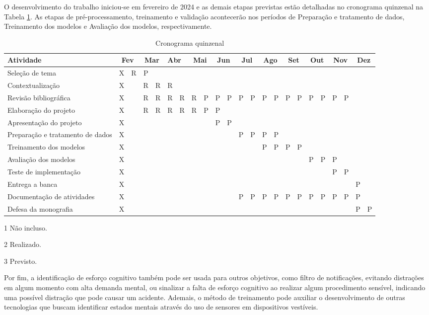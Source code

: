 O desenvolvimento do trabalho iniciou-se em fevereiro de 2024 e as demais etapas previstas estão detalhadas no cronograma quinzenal na Tabela \ref{ref:cronograma}. As etapas de pré-processamento, treinamento e validação acontecerão nos períodos de Preparação e tratamento de dados, Treinamento dos modelos e Avaliação dos modelos, respectivamente.  
\begin{table}
\centering
\tiny
\begin{threeparttable}
\caption{Cronograma quinzenal}
\label{ref:cronograma} 
\setlength\tabcolsep{5pt}
\begin{tabular}{ |l|c|c|c|c|c|c|c|c|c|c|c|c|c|c|c|c|c|c|c|c|c|c| } 
\hline
Atividade & \multicolumn{2}{|c|}{Fev} & \multicolumn{2}{|c|}{Mar} & \multicolumn{2}{|l|}{Abr} & \multicolumn{2}{|c|}{Mai} & \multicolumn{2}{|c|}{Jun} & \multicolumn{2}{|c|}{Jul} & \multicolumn{2}{|c|}{Ago} & \multicolumn{2}{|c|}{Set} & \multicolumn{2}{|c|}{Out} & \multicolumn{2}{|c|}{Nov} & \multicolumn{2}{|c|}{Dez} \\
\hline
Seleção de tema &X\tnote{1}&R\tnote{2}&P\tnote{3}&&&&&&&&&&&&&&&&&&& \\
\hline
Contextualização &X&&R&R&R&&&&&&&&&&&&&&&&&\\
\hline
Revisão bibliográfica &X&&R&R&R&R&R&P&P&P&P&P&P&P&P&P&P&P&P&P&&\\
\hline
Elaboração do projeto &X&&R&R&R&R&R&P&P&&&&&&&&&&&&&\\
\hline
Apresentação do projeto &X&&&&&&&&P&P&&&&&&&&&&&&\\
\hline
Preparação e tratamento de dados &X&&&&&&&&&&P&P&P&P&&&&&&&&\\
\hline
Treinamento dos modelos &X&&&&&&&&&&&&P&P&P&P&&&&&&\\
\hline
Avaliação dos modelos &X&&&&&&&&&&&&&&&&P&P&P&&&\\
\hline
Teste de implementação &X&&&&&&&&&&&&&&&&&&P&P&&\\
\hline
Entrega a banca &X&&&&&&&&&&&&&&&&&&&&P&\\
\hline
Documentação de atividades &X&&&&&&&&&&P&P&P&P&P&P&P&P&P&P&P&\\
\hline
Defesa da monografia &X&&&&&&&&&&&&&&&&&&&&P&P\\
\hline
\end{tabular}
\begin{tablenotes}
\item[1] Não incluso.
\item[2] Realizado.
\item[3] Previsto.
\end{tablenotes}
\end{threeparttable}
\sourcemedaddy
\end{table}

Por fim, a identificação de esforço cognitivo também pode ser usada para outros objetivos, como filtro de notificações, evitando distrações em algum momento com alta demanda mental, ou sinalizar a falta de esforço cognitivo ao realizar algum procedimento sensível, indicando uma possível distração que pode causar um acidente. Ademais, o método de treinamento pode auxiliar o desenvolvimento de outras tecnologias que buscam identificar estados mentais através do uso de sensores em dispositivos vestíveis.
